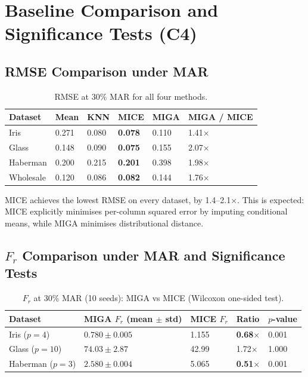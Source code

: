 
\section{Baseline Comparison and Significance Tests (C4)}
\label{sec:significance}

\subsection{RMSE Comparison under MAR}

\begin{table}[h]
\caption{RMSE at 30\% MAR for all four methods.}
\label{tab:rmse}
\centering
\begin{tabular}{llllll}
\toprule
\textbf{Dataset} & \textbf{Mean} & \textbf{KNN} & \textbf{MICE} & \textbf{MIGA} & \textbf{MIGA / MICE} \\
\midrule
Iris     & 0.271 & 0.080 & \textbf{0.078} & 0.110 & 1.41$\times$ \\
Glass    & 0.148 & 0.090 & \textbf{0.075} & 0.155 & 2.07$\times$ \\
Haberman & 0.200 & 0.215 & \textbf{0.201} & 0.398 & 1.98$\times$ \\
Wholesale& 0.120 & 0.086 & \textbf{0.082} & 0.144 & 1.76$\times$ \\
\bottomrule
\end{tabular}
\end{table}

MICE achieves the lowest RMSE on every dataset, by 1.4--2.1$\times$. This is expected: MICE explicitly minimises per-column squared error by imputing conditional means, while MIGA minimises distributional distance.

\subsection{$F_r$ Comparison under MAR and Significance Tests}

\begin{table}[h]
\caption{$F_r$ at 30\% MAR (10 seeds): MIGA vs MICE (Wilcoxon one-sided test).}
\label{tab:fr}
\centering
\begin{tabular}{lllll}
\toprule
\textbf{Dataset} & \textbf{MIGA $F_r$} (mean $\pm$ std) & \textbf{MICE $F_r$} & \textbf{Ratio} & $p$-\textbf{value} \\
\midrule
Iris ($p=4$)    & $0.780 \pm 0.005$ & 1.155 & \textbf{0.68$\times$} & 0.001 \\
Glass ($p=10$)  & $74.03 \pm 2.87$  & 42.99 & 1.72$\times$          & 1.000 \\
Haberman ($p=3$)& $2.580 \pm 0.004$ & 5.065 & \textbf{0.51$\times$} & 0.001 \\
\bottomrule
\end{tabular}
\end{table}


